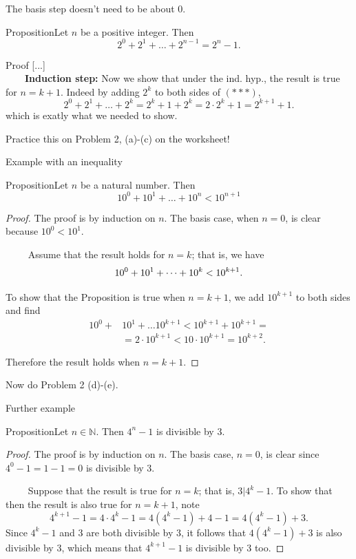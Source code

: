 \documentclass{beamer}
\def\bl[#1]#2{\begin{block}{#1}#2\end{block}}
\begin{document}
\begin{frame}{The basis step doesn't need to be about $0$.}

\bl[Proposition]{Let $n$ be a positive integer. Then
\[
2^0+2^1+\dots+2^{n-1}=2^n-1.
\]}

\bl[Proof]{
[...]\\
~~~~\textbf{Induction step:} Now we show that under the ind. hyp., the result is true for $n=k+1$. Indeed by adding $2^k$ to both sides of $(***)$,
\[
2^0+2^1+\dots+2^{k}=2^k+1+2^k=2\cdot 2^{k}+1=2^{k+1}+1.
\]
which is exatly what we needed to show.
}
\center Practice this on Problem 2, (a)-(c) on the worksheet!
\end{frame}

\begin{frame}{Example with an inequality}
\bl[Proposition]{Let $n$ be a natural number. Then\vspace{-0.3cm}
\[
10^0+10^1+\dots+10^n<10^{n+1}
\]}
\begin{proof}
The proof is by induction on $n$. The basis case, when $n=0$, is clear because $10^0<10^1$.

~~~~ Assume that the result holds for $n=k$; that is, we have\vspace{-0.3cm}
\[
10^0+10^1+\dots+10^k<10^{k+1}.\vspace{-0.3cm}
\]

To show that the Proposition is true when $n=k+1$, we add $10^{k+1}$ to both sides and find\vspace{-0.3cm}
\begin{align*}
10^0+&10^1+\dots 10^{k+1}<10^{k+1}+10^{k+1}=\\
&=2\cdot 10^{k+1}<10\cdot 10^{k+1}=10^{k+2}.
\end{align*}\vspace{-0.7cm}

Therefore the result holds when $n=k+1$.\qedhere
\end{proof}
\end{frame}

\begin{frame}
\center Now do Problem 2 (d)-(e).
\end{frame}

\begin{frame}{Further example}
\bl[Proposition]{Let $n\in\mathbb{N}$. Then $4^n-1$ is divisible by $3$.}

\begin{proof}
The proof is by induction on $n$. The basis case, $n=0$, is clear since $4^0-1=1-1=0$ is divisible by $3$.

~~~~ Suppose that the result is true for $n=k$; that is, $3|4^k-1$. To show that then the result is also true for $n=k+1$, note
\[
4^{k+1}-1=4\cdot 4^k-1=4(4^k-1)+4-1=4(4^k-1)+3.
\]
Since $4^k-1$ and $3$ are both divisible by $3$, it follows that $4(4^k-1)+3$ is also divisible by $3$, which means that $4^{k+1}-1$ is divisible by $3$ too.
\end{proof}

\end{frame}
\end{document}
